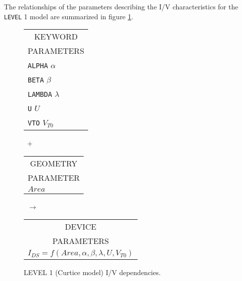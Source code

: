 The relationships of the parameters describing the I/V
characteristics for the {\tt LEVEL} 1 model are summarized in figure
\ref{blevel1i/v}.\\[0.1in]
\begin{figure}[h]
\begin{tabular}[t]{|p{1in}|}
\hline
\multicolumn{1}{|c|}{KEYWORD} \\
\multicolumn{1}{|c|}{PARAMETERS} \\
\hline
\hline
{\tt ALPHA} \hfill $\alpha$\\
{\tt BETA} \hfill $\beta$\\
{\tt LAMBDA} \hfill $\lambda$\\
{\tt U} \hfill $U$\\
{\tt VTO} \hfill $V_{T0}$\\
\hline
\end{tabular}
\hfill
\parbox{0.2in}{\ \vspace*{0.2in}\newline +}
\hfill
\begin{tabular}[t]{|p{1in}|}
\hline
\multicolumn{1}{|c|}{GEOMETRY} \\
\multicolumn{1}{|c|}{PARAMETER} \\
\hline
\hspace*{\fill}$Area$\\
\hline
\end{tabular}
\hfill
\parbox{0.2in}{\ \vspace*{0.2in}\newline $\rightarrow$}
\hfill
\begin{tabular}[t]{|p{1.8in}|}
\hline
\multicolumn{1}{|c|}{DEVICE} \\
\multicolumn{1}{|c|}{PARAMETERS} \\
\hline
$I_{DS} = f(Area, \alpha, \beta, \lambda, U, V_{T0})$\\
\hline
\end{tabular}
\caption{LEVEL 1 (Curtice model) I/V dependencies. \label{blevel1i/v}}
\end{figure}

